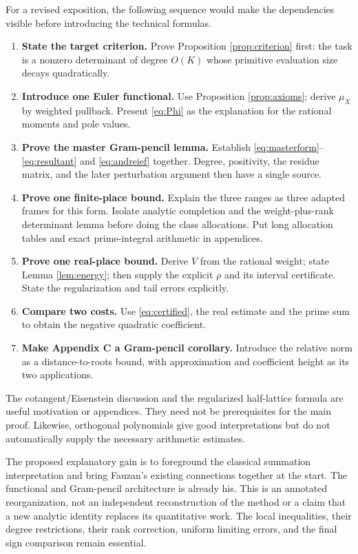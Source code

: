 \documentclass[11pt]{article}
\theoremstyle{definition}
\theoremstyle{remark}\newtheorem*{remark}{Remark}
\begin{document}
For a revised exposition, the following sequence would make the dependencies
visible before introducing the technical formulas.
\begin{enumerate}
\item \textbf{State the target criterion.} Prove Proposition
\ref{prop:criterion} first: the task is a nonzero determinant of degree $O(K)$
whose primitive evaluation size decays quadratically.
\item \textbf{Introduce one Euler functional.} Use Proposition
\ref{prop:axioms}; derive $\mu_X$ by weighted pullback. Present \eqref{eq:Phi}
as the explanation for the rational moments and pole values.
\item \textbf{Prove the master Gram-pencil lemma.} Establish
\eqref{eq:masterform}--\eqref{eq:resultant} and \eqref{eq:andreief} together.
Degree, positivity, the residue matrix, and the later perturbation argument
then have a single source.
\item \textbf{Prove one finite-place bound.} Explain the three ranges as three
adapted frames for this form. Isolate analytic completion and the
weight-plus-rank determinant lemma before doing the class allocations.
Put long allocation tables and exact prime-integral arithmetic in appendices.
\item \textbf{Prove one real-place bound.} Derive $V$ from the rational weight;
state Lemma \ref{lem:energy}; then supply the explicit $\rho$ and its interval
certificate. State the regularization and tail errors explicitly.
\item \textbf{Compare two costs.} Use \eqref{eq:certified}, the real estimate
and the prime sum to obtain the negative quadratic coefficient.
\item \textbf{Make Appendix C a Gram-pencil corollary.} Introduce the relative
norm as a distance-to-roots bound, with approximation and coefficient height
as its two applications.
\end{enumerate}

The cotangent/Eisenstein discussion and the regularized half-lattice formula
are useful motivation or appendices. They need not be prerequisites for the
main proof. Likewise, orthogonal polynomials give good interpretations but do
not automatically supply the necessary arithmetic estimates.

The proposed explanatory gain is to foreground the classical summation
interpretation and bring Fauzan's existing connections together at the start.
The functional and Gram-pencil architecture is already his. This is an
annotated reorganization, not an independent reconstruction of the method or
a claim that a new analytic identity replaces its quantitative work.
The local inequalities, their degree restrictions, their rank correction,
uniform limiting errors, and the final sign comparison remain essential.
\end{document}
